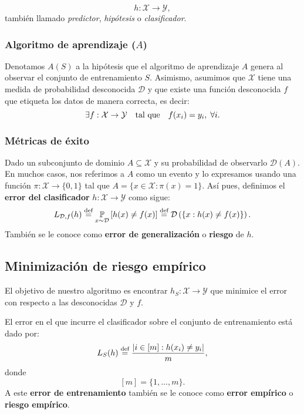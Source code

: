 \documentclass[8pt,a4paper]{extarticle}
\begin{document}
\begin{multicols}{3}
	$$h : \mathcal{X} \to \mathcal{Y},$$ también llamado \emph{predictor}, \emph{hipótesis} o \emph{clasificador}.

	\subsubsection*{Algoritmo de aprendizaje ($A$)}

	Denotamos $A(S)$ a la hipótesis que el algoritmo de aprendizaje $A$ genera al observar el conjunto de entrenamiento $S$. Asimismo, asumimos que $\mathcal{X}$ tiene una medida de probabilidad desconocida $\mathcal{D}$ y que existe una función desconocida $f$ que etiqueta los datos de manera correcta, es decir:
	\[
		\exists f:\mathcal{X}\to \mathcal{Y}\quad \text{\normalfont tal que} \quad f(x_i) = y_i,\; \forall i
		.\]

	\subsubsection*{Métricas de éxito}

	\begin{boxdef}
		Dado un subconjunto de dominio $A \subseteq \mathcal{X}$ y su probabilidad de observarlo $\mathcal{D}(A)$. En muchos casos, nos referimos a $A$ como un evento y lo expresamos usando una función $\pi : \mathcal{X} \to \{0,1\}$ tal que $A = \{x \in \mathcal{X} : \pi(x) = 1\} $. Así pues, definimos el \textbf{error del clasificador} $h : \mathcal{X} \to \mathcal{Y}$ como sigue:
		\[
			L_{\mathcal{D}, f} (h) \stackrel{\text{\normalfont def}}{=} \underset{x \sim \mathcal{D}}{\mathbb{P}} \left[ h(x) \neq f(x) \right] \stackrel{\text{\normalfont def}}{=} \mathcal{D}\left( \{x : h(x) \neq f(x)\}  \right)
			.\]
		También se le conoce como \textbf{error de generalización} o \textbf{riesgo} de $h$.
	\end{boxdef}

	\subsection{Minimización de riesgo empírico}

	El objetivo de nuestro algoritmo es encontrar $h_S : \mathcal{X} \to \mathcal{Y}$ que minimice el error con respecto a las desconocidas $\mathcal{D}$ y $f$.

	\begin{boxdef}
		El error en el que incurre el clasificador sobre el conjunto de entrenamiento está dado por:
		\[
			L_S (h) \stackrel{\text{\normalfont def}}{=} \frac{\left| i \in [m] : h(x_i) \neq y_i \right| }{m}
			,\]
		donde
		\[
			[m] = \{1,\ldots, m\}
			.\]
		A este \textbf{error de entrenamiento} también se le conoce como \textbf{error empírico} o \textbf{riesgo empírico}.
	\end{boxdef}


\end{multicols}
\end{document}
